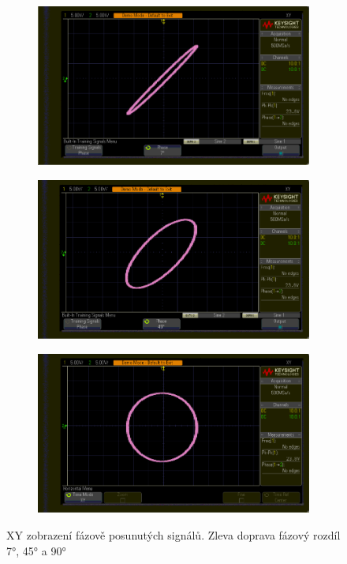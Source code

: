 \documentclass[twoside]{article}
\begin{document}
\begin{figure}[htbp]
	\centering

	
	\begin{subfigure}{0.3\textwidth}
		\includegraphics[width=\linewidth]{xy_7deg.png}
	\end{subfigure}
	\begin{subfigure}{0.3\textwidth}
		\includegraphics[width=\linewidth]{xy_45deg.png}
	\end{subfigure}
	\begin{subfigure}{0.3\textwidth}
		\includegraphics[width=\linewidth]{xy_90deg.png}
	\end{subfigure}
	\caption{XY zobrazení fázově posunutých signálů. Zleva doprava fázový rozdíl 7°, 45° a 90°}
\end{figure}
\end{document}
